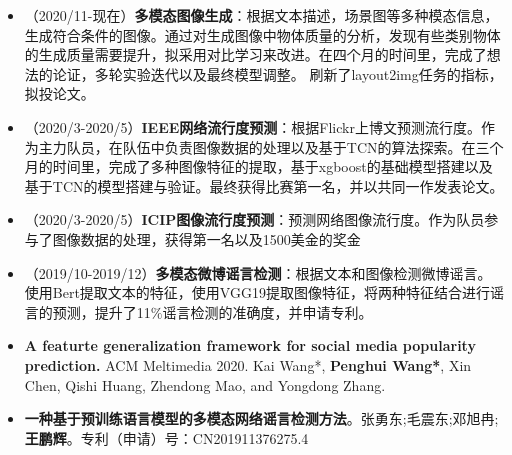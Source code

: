 \documentclass[zh]{resume}
\begin{document}
\begin{itemize}
  \item  （2020/11-现在）\textbf{多模态图像生成}：根据文本描述，场景图等多种模态信息，生成符合条件的图像。通过对生成图像中物体质量的分析，发现有些类别物体的生成质量需要提升，拟采用对比学习来改进。在四个月的时间里，完成了想法的论证，多轮实验迭代以及最终模型调整。 刷新了layout2img任务的指标，拟投论文。
  \item （2020/3-2020/5）\textbf{IEEE网络流行度预测}：根据Flickr上博文预测流行度。作为主力队员，在队伍中负责图像数据的处理以及基于TCN的算法探索。在三个月的时间里，完成了多种图像特征的提取，基于xgboost的基础模型搭建以及基于TCN的模型搭建与验证。最终获得比赛第一名，并以共同一作发表论文。
  \item （2020/3-2020/5）\textbf{ICIP图像流行度预测}：预测网络图像流行度。作为队员参与了图像数据的处理，获得第一名以及1500美金的奖金
  \item （2019/10-2019/12）\textbf{多模态微博谣言检测}：根据文本和图像检测微博谣言。使用Bert提取文本的特征，使用VGG19提取图像特征，将两种特征结合进行谣言的预测，提升了11$\%$谣言检测的准确度，并申请专利。

\end{itemize}

\begin{itemize}
  \item \textbf{A featurte generalization framework for social media popularity prediction.} ACM Meltimedia 2020. 
  Kai Wang*, \textbf{Penghui Wang*}, Xin Chen, Qishi Huang, Zhendong Mao, and Yongdong Zhang.
  \item \textbf{一种基于预训练语言模型的多模态网络谣言检测方法}。张勇东;毛震东;邓旭冉;\textbf{王鹏辉}。专利（申请）号：CN201911376275.4

\end{itemize}


\end{document}
